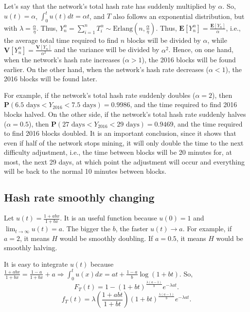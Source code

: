 Let's say that the network's total hash rate has suddenly multiplied by $\alpha$. So, $u(t) = \alpha$, $\int_0^t u(t) dt = \alpha t$, and $T$ also follows an exponential distribution, but with $\lambda = \frac{\alpha}{\eta}$. Thus, $Y_n^\alpha = \sum_{i=1}^{n} T_i^\alpha \sim \text{Erlang}(n, \frac{\alpha}{\eta})$. Thus, $\mathbf{E}[Y_{n}^\alpha] = \frac{\mathbf{E}[Y_{n}]}{\alpha}$, i.e., the average total time required to find $n$ blocks will be divided by $\alpha$, while $\mathbf{V}[Y_{n}^\alpha] = \frac{\mathbf{V}[Y_n]}{\alpha^2}$ and the variance will be divided by $\alpha^2$. Hence, on one hand, when the network's hash rate increases ($\alpha > 1$), the 2016 blocks will be found earlier. On the other hand, when the network's hash rate decreases ($\alpha < 1$), the 2016 blocks will be found later.

For example, if the network's total hash rate suddenly doubles ($\alpha = 2$), then $\mathbf{P}(6.5 \text{ days} < Y_{2016} < 7.5 \text{ days}) = 0.9986$, and the time required to find 2016 blocks halved. On the other side, if the network's total hash rate suddenly halves ($\alpha = 0.5$), then $\mathbf{P}(27 \text{ days} < Y_{2016} < 29 \text{ days}) = 0.9469$, and the time required to find 2016 blocks doubled. It is an important conclusion, since it shows that even if half of the network stops mining, it will only double the time to the next difficulty adjustment, i.e., the time between blocks will be 20 minutes for, at most, the next 29 days, at which point the adjustment will occur and everything will be back to the normal 10 minutes between blocks.


\subsection{Hash rate smoothly changing}

Let $u(t) = \frac{1+abx}{1+bx}$. It is an useful function because $u(0) = 1$ and $\lim_{t \rightarrow \infty} u(t) = a$. The bigger the $b$, the faster $u(t) \rightarrow a$. For example, if $a=2$, it means $H$ would be smoothly doubling. If $a=0.5$, it means $H$ would be smoothly halving.

It is easy to integrate $u(t)$ because $\frac{1+abx}{1+bx} = \frac{1-a}{1+bx} + a \Rightarrow \int_0^t u(x) dx = at + \frac{1-a}{b} \log(1+bt)$. So,
$$F_T(t) = 1 - (1+bt)^{\frac{\lambda(a-1)}{b}} e^{-\lambda at}.$$
$$f_T(t) = \lambda \left( \frac{1+abt}{1+bt} \right) (1+bt)^{\frac{\lambda(a-1)}{b}} e^{-\lambda at}.$$

